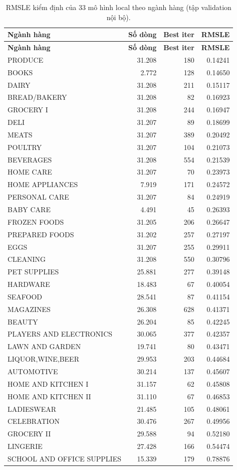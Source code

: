 \documentclass[12pt,a4paper]{report}
\begin{document}
\begin{longtable}{@{}lrrr@{}}
\caption{RMSLE kiểm định của 33 mô hình local theo ngành hàng (tập validation nội bộ).}\\
\toprule
\textbf{Ngành hàng} & \textbf{Số dòng} & \textbf{Best iter} & \textbf{RMSLE} \\
\midrule
\endfirsthead
\toprule
\textbf{Ngành hàng} & \textbf{Số dòng} & \textbf{Best iter} & \textbf{RMSLE} \\
\midrule
\endhead
\bottomrule
\endlastfoot
PRODUCE & 31.208 & 180 & 0.14241 \\
BOOKS & 2.772 & 128 & 0.14650 \\
DAIRY & 31.208 & 211 & 0.15117 \\
BREAD/BAKERY & 31.208 & 82 & 0.16923 \\
GROCERY I & 31.208 & 244 & 0.16947 \\
DELI & 31.207 & 89 & 0.18699 \\
MEATS & 31.207 & 389 & 0.20492 \\
POULTRY & 31.207 & 104 & 0.21073 \\
BEVERAGES & 31.208 & 554 & 0.21539 \\
HOME CARE & 31.207 & 70 & 0.23973 \\
HOME APPLIANCES & 7.919 & 171 & 0.24572 \\
PERSONAL CARE & 31.207 & 84 & 0.24919 \\
BABY CARE & 4.491 & 45 & 0.26393 \\
FROZEN FOODS & 31.205 & 206 & 0.26647 \\
PREPARED FOODS & 31.202 & 257 & 0.27197 \\
EGGS & 31.207 & 255 & 0.29911 \\
CLEANING & 31.208 & 550 & 0.30796 \\
PET SUPPLIES & 25.881 & 277 & 0.39148 \\
HARDWARE & 18.483 & 67 & 0.40054 \\
SEAFOOD & 28.541 & 87 & 0.41154 \\
MAGAZINES & 26.308 & 628 & 0.41371 \\
BEAUTY & 26.204 & 85 & 0.42245 \\
PLAYERS AND ELECTRONICS & 30.065 & 377 & 0.42357 \\
LAWN AND GARDEN & 19.741 & 80 & 0.43471 \\
LIQUOR,WINE,BEER & 29.953 & 203 & 0.44684 \\
AUTOMOTIVE & 30.214 & 137 & 0.45607 \\
HOME AND KITCHEN I & 31.157 & 62 & 0.45808 \\
HOME AND KITCHEN II & 31.110 & 67 & 0.46853 \\
LADIESWEAR & 21.485 & 105 & 0.48061 \\
CELEBRATION & 30.476 & 267 & 0.49956 \\
GROCERY II & 29.588 & 94 & 0.52180 \\
LINGERIE & 27.428 & 166 & 0.54474 \\
SCHOOL AND OFFICE SUPPLIES & 15.339 & 179 & 0.78876 \\
\end{longtable}
\end{document}
